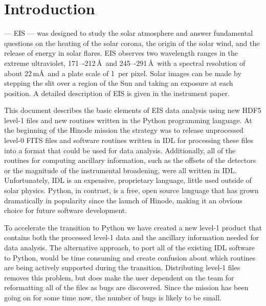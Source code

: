 
\chapter{Introduction}

 --- EIS --- was designed to study the solar atmosphere and answer
fundamental questions on the heating of the solar corona, the origin of the solar wind, and the
release of energy in solar flares. EIS observes two wavelength ranges in the extreme ultraviolet,
171–-212\,\AA\ and 245–-291\,\AA\ with a spectral resolution of about 22\,m\AA\ and a plate scale
of 1\arcsec\ per pixel. Solar images can be made by stepping the slit over a region of the Sun and
taking an exposure at each position. A detailed description of EIS is given in the instrument
paper\cite{Culhane:2007}.

This document describes the basic elements of EIS data analysis using new HDF5 level-1 files and
new routines written in the Python programming language. At the beginning of the Hinode mission the
strategy was to release unprocessed level-0 FITS files and software routines written in IDL for
processing these files into a format that could be used for data analysis. Additionally, all of
the routines for computing ancillary information, such as the offsets of the detectors or the magnitude
of the instrumental broadening, were all written in IDL. Unfortunately, IDL is an expensive,
proprietary language, little used outside of solar physics. Python, in contrast, is a free, open
source language that has grown dramatically in popularity since the launch of Hinode, making it an
obvious choice for future software development.

To accelerate the transition to Python we have created a new level-1 product that contains both the
processed level-1 data and the ancillary information needed for data analysis. The alternative
approach, to port all of the existing IDL software to Python, would be time consuming and create
confusion about which routines are being actively supported during the transition. Distributing
level-1 files removes this problem, but does make the user dependent on the team for reformatting
all of the files as bugs are discovered. Since the mission has been going on for some time now, the
number of bugs is likely to be small.

